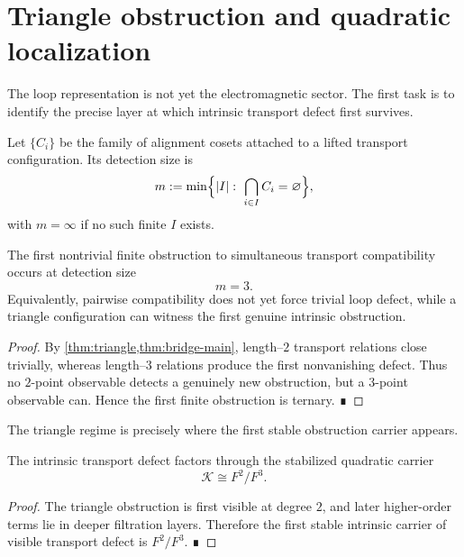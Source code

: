 \section{Triangle obstruction and quadratic localization}
\label{sec:em-triangle-localization}
The loop representation is not yet the electromagnetic sector.
The first task is to identify the precise layer at which intrinsic
transport defect first survives.
\begin{definition}
	Let \(\{C_i\}\) be the family of alignment cosets attached to a lifted
	transport configuration.
	Its detection size is
	\[
		m:=\min\Bigl\{|I|:\ \bigcap_{i\in I} C_i=\varnothing\Bigr\},
	\]
	with \(m=\infty\) if no such finite \(I\) exists.
\end{definition}
\begin{theorem}
	\label{thm:em-triangle-minimal}
	The first nontrivial finite obstruction to simultaneous transport
	compatibility occurs at detection size
	\[
		m=3.
	\]
	Equivalently, pairwise compatibility does not yet force trivial loop
	defect, while a triangle configuration can witness the first genuine
	intrinsic obstruction.
\end{theorem}
\begin{proof}
	By \cref{thm:triangle,thm:bridge-main}, length--\(2\)
	transport relations close trivially, whereas length--\(3\) relations
	produce the first nonvanishing defect.
	Thus no \(2\)-point observable detects a genuinely new obstruction, but
	a \(3\)-point observable can.
	Hence the first finite obstruction is ternary. ∎
\end{proof}
The triangle regime is precisely where the first stable obstruction
carrier appears.
\begin{corollary}
	The intrinsic transport defect factors through the stabilized
	quadratic carrier
	\[
		\mathcal K \cong F^2/F^3.
	\]
\end{corollary}
\begin{proof}
	The triangle obstruction is first visible at degree \(2\), and later
	higher-order terms lie in deeper filtration layers.
	Therefore the first stable intrinsic carrier of visible transport
	defect is \(F^2/F^3\). ∎
\end{proof}
